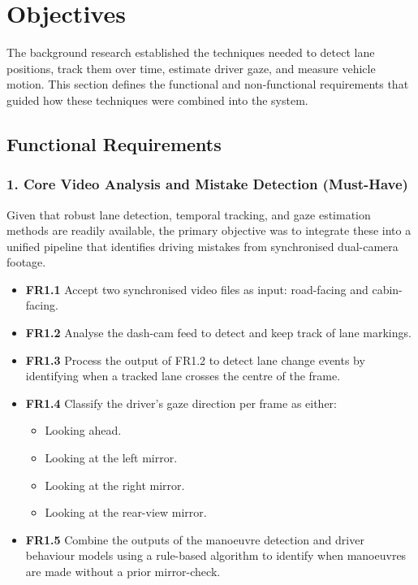 \documentclass{article}
\begin{document}
\newpage

\section{Objectives}

The background research established the techniques needed to detect lane positions, track them over time, estimate driver gaze, and measure vehicle motion. This section defines the functional and non-functional requirements that guided how these techniques were combined into the system.

\subsection*{Functional Requirements}

\subsubsection*{1. Core Video Analysis and Mistake Detection (Must-Have)}
Given that robust lane detection, temporal tracking, and gaze estimation methods are readily available, the primary objective was to integrate these into a unified pipeline that identifies driving mistakes from synchronised dual-camera footage.

\begin{itemize}
    \item \textbf{FR1.1} Accept two synchronised video files as input: road-facing and cabin-facing.
    \item \textbf{FR1.2} Analyse the dash-cam feed to detect and keep track of lane markings.
    \item \textbf{FR1.3} Process the output of FR1.2 to detect lane change events by identifying when a tracked lane crosses the centre of the frame.
    \item \textbf{FR1.4} Classify the driver's gaze direction per frame as either:
    \begin{itemize}
        \item Looking ahead.
        \item Looking at the left mirror.
        \item Looking at the right mirror.
        \item Looking at the rear-view mirror.
    \end{itemize}
    \item \textbf{FR1.5} Combine the outputs of the manoeuvre detection and driver behaviour models using a rule-based algorithm to identify when manoeuvres are made without a prior mirror-check.
\end{itemize}
\end{document}
